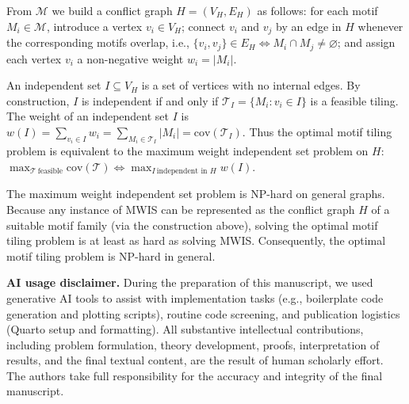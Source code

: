 \documentclass[
  11pt,
  letterpaper]{siamart251216}
\begin{document}
From \(\mathcal{M}\) we build a conflict graph \(H = (V_H, E_H)\) as
follows: for each motif \(M_i \in \mathcal{M}\), introduce a vertex
\(v_i \in V_H\); connect \(v_i\) and \(v_j\) by an edge in \(H\)
whenever the corresponding motifs overlap, i.e.,
\(\{v_i, v_j\} \in E_H \iff M_i \cap M_j \ne \varnothing\); and assign
each vertex \(v_i\) a non-negative weight \(w_i = |M_i|\).

An independent set \(I \subseteq V_H\) is a set of vertices with no
internal edges. By construction, \(I\) is independent if and only if
\(\mathcal{T}_I = \{M_i : v_i \in I\}\) is a feasible tiling. The weight
of an independent set \(I\) is
\(w(I) = \sum_{v_i \in I} w_i = \sum_{M_i \in \mathcal{T}_I} |M_i| = \mathrm{cov}(\mathcal{T}_I)\).
Thus the optimal motif tiling problem is equivalent to the maximum
weight independent set problem on \(H\):
\(\max_{\mathcal{T}\ \text{feasible}} \mathrm{cov}(\mathcal{T}) \Longleftrightarrow \max_{I\ \text{independent in } H} w(I)\).

The maximum weight independent set problem is NP-hard on general graphs.
Because any instance of MWIS can be represented as the conflict graph
\(H\) of a suitable motif family (via the construction above), solving
the optimal motif tiling problem is at least as hard as solving MWIS.
Consequently, the optimal motif tiling problem is NP-hard in general.

\textbf{AI usage disclaimer.} During the preparation of this manuscript,
we used generative AI tools to assist with implementation tasks (e.g.,
boilerplate code generation and plotting scripts), routine code
screening, and publication logistics (Quarto setup and formatting). All
substantive intellectual contributions, including problem formulation,
theory development, proofs, interpretation of results, and the final
textual content, are the result of human scholarly effort. The authors
take full responsibility for the accuracy and integrity of the final
manuscript.
\end{document}
